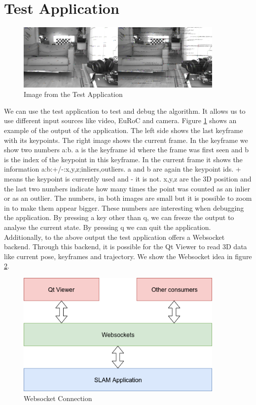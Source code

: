 \documentclass[11pt,a4paper,titlepage,oneside]{report}
\begin{document}
\section{Test Application}

\begin{figure}[H]
  \centering
  \includegraphics[width=0.9\textwidth]{img/test_app.png}
  \caption{Image from the Test Application}\label{fig:test_app}
\end{figure}

We can use the test application to test and debug the algorithm. It allows us to use different input sources like video, EuRoC and camera. Figure \ref{fig:test_app} shows an example of the output of the application. The left side shows the last keyframe with its keypoints. The right image shows the current frame. In the keyframe we show two numbers a:b. a is the keyframe id where the frame was first seen and b is the index of the keypoint in this keyframe. In the current frame it shows the information a:b:+/-:x,y,z;inliers,outliers. a and b are again the keypoint ids. + means the keypoint is currently used and - it is not. x,y,z are the 3D position and the last two numbers indicate how many times the point was counted as an inlier or as an outlier. The numbers, in both images are small but it is possible to zoom in to make them appear bigger. These numbers are interesting when debugging the application. By pressing a key other than q, we can freeze the output to analyse the current state. By pressing q we can quit the application.\\
Additionally, to the above output the test application offers a Websocket \cite{websocket} backend. Through this backend, it is possible for the Qt Viewer to read 3D data like current pose, keyframes and trajectory. We show the Websocket idea in figure \ref{fig:websocket}.

\begin{figure}[H]
  \centering
  \includegraphics[width=0.9\textwidth]{img/websocket.png}
  \caption{Websocket Connection}\label{fig:websocket}
\end{figure}
\end{document}
